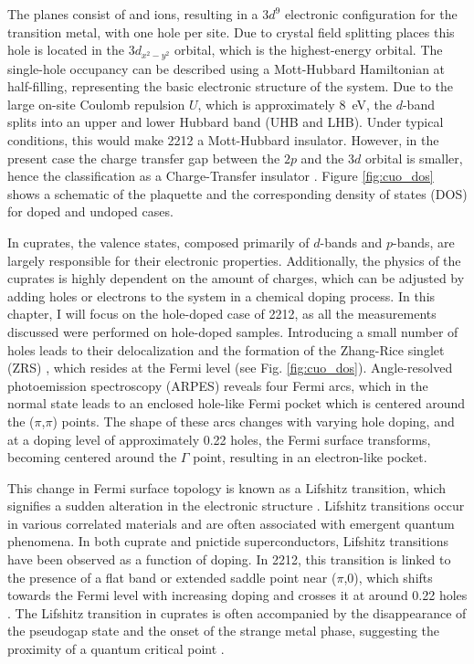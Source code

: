 The  planes consist of  and  ions, resulting in a $3d^9$ electronic configuration for the transition metal, with one hole per site.
Due to crystal field splitting places this hole is located in the $3d_{x^2-y^2}$ orbital, which is the highest-energy orbital.
The single-hole occupancy can be described using a Mott-Hubbard Hamiltonian at half-filling, representing the basic electronic structure of the system.
Due to the large on-site Coulomb repulsion $U$, which is approximately \qty{8}{\electronvolt}, the $d$-band splits into an upper and lower Hubbard band (UHB and LHB).
Under typical conditions, this would make 2212 a Mott-Hubbard insulator.
However, in the present case the charge transfer gap between the  $2p$ and the  $3d$ orbital is smaller, hence the classification as a Charge-Transfer insulator \cite{zaanen_band_1985,zegrodnik_superconductivity_2019}.
Figure \ref{fig:cuo_dos} shows a schematic of the  plaquette and the corresponding density of states (DOS) for doped and undoped cases.

In cuprates, the valence states, composed primarily of  $d$-bands and  $p$-bands, are largely responsible for their electronic properties.
Additionally, the physics of the cuprates is highly dependent on the amount of charges, which can be adjusted by adding holes or electrons to the system in a chemical doping process.
In this chapter, I will focus on the hole-doped case of 2212, as all the measurements discussed were performed on hole-doped samples.
Introducing a small number of holes leads to their delocalization and the formation of the Zhang-Rice singlet (ZRS) \cite{zhang_effective_1988}, which resides at the Fermi level (see Fig. \ref{fig:cuo_dos}).
Angle-resolved photoemission spectroscopy (ARPES) reveals four Fermi arcs, which in the normal state leads to an enclosed hole-like Fermi pocket which is centered around the ($\pi$,$\pi$) points.
The shape of these arcs changes with varying hole doping, and at a doping level of approximately 0.22 holes, the Fermi surface transforms, becoming centered around the $\Gamma$ point, resulting in an electron-like pocket.

This change in Fermi surface topology is known as a Lifshitz transition, which signifies a sudden alteration in the electronic structure \cite{lifshitz_anomalies_1960}.
Lifshitz transitions occur in various correlated materials and are often associated with emergent quantum phenomena.
In both cuprate and pnictide superconductors, Lifshitz transitions have been observed as a function of doping.
In 2212, this transition is linked to the presence of a flat band or extended saddle point near ($\pi$,$0$), which shifts towards the Fermi level with increasing doping and crosses it at around 0.22 holes \cite{campuzano_photoemission_2004, gofron_observation_1994}.
The Lifshitz transition in cuprates is often accompanied by the disappearance of the pseudogap state \cite{matt_electron_2015, benhabib_collapse_2015} and the onset of the strange metal phase, suggesting the proximity of a quantum critical point \cite{michon_thermodynamic_2019, chen_incoherent_2019, cooper_anomalous_2009, badoux_change_2016, putzke_reduced_2021}.

